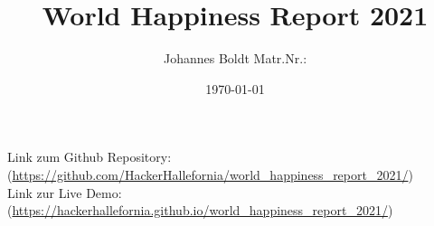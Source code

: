 \subject{Projektbericht zum Modul Information Retrieval und Visualisierung Sommersemester 2022}
\title{World Happiness Report 2021}
\author{Johannes Boldt Matr.Nr.:}%
\date{\today}
\maketitle%
\vspace{12cm}
\begin{centering}

\hline
\vspace{0.5cm}
Link zum Github Repository: \\
(\href{https://github.com/HackerHallefornia/world_happiness_report_2021}{https://github.com/HackerHallefornia/world\_happiness\_report\_2021/}) \\

Link zur Live Demo: \\
(\href{https://hackerhallefornia.github.io/world_happiness_report_2021/}{https://hackerhallefornia.github.io/world\_happiness\_report\_2021/})
    
\end{centering}
\clearpage

